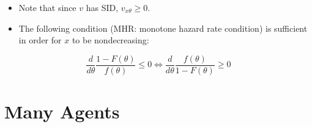 \documentclass[11pt,a4paper,dvipdfmx]{article}
\theoremstyle{plain}
\newcommand{\equi}{\Longleftrightarrow}
\newcommand{\1}{\mathbbm{1}}
\begin{document}
\begin{itemize}
	\item Note that since $v$ has SID, $v_{x \theta} \geq 0$.
	\item The following condition (MHR: monotone hazard rate condition) is sufficient in order for $x$ to be nondecreasing:
\end{itemize}
\[
\frac{d}{d\theta}\frac{1 - F(\theta)}{f(\theta)} \leq 0
\equi \frac{d}{d\theta}\frac{f(\theta)}{1 - F(\theta)} \geq 0
\]


\newpage
\section{Many Agents}
\end{document}
